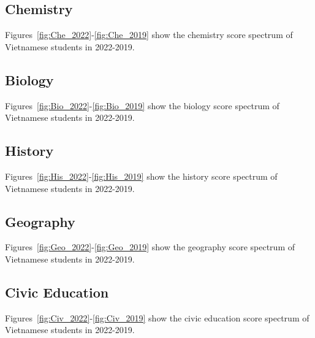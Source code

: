\documentclass{article}
\begin{document}
{	\subsection{Chemistry}
	\label{sec:Score Spectrum_Che}
	
	Figures~\ref{fig:Che_2022}-\ref{fig:Che_2019} show the chemistry score spectrum of Vietnamese students in 2022-2019.
	
	\subsection{Biology}
	\label{sec:Score Spectrum_Bio}
	
	Figures~\ref{fig:Bio_2022}-\ref{fig:Bio_2019} show the biology score spectrum of Vietnamese students in 2022-2019.
	
	\subsection{History}
	\label{sec:Score Spectrum_His}
	
	Figures~\ref{fig:His_2022}-\ref{fig:His_2019} show the history score spectrum of Vietnamese students in 2022-2019.
	
	\subsection{Geography}
	\label{sec:Score Spectrum_Geo}
	
	Figures~\ref{fig:Geo_2022}-\ref{fig:Geo_2019} show the geography score spectrum of Vietnamese students in 2022-2019.
	
	\subsection{Civic Education}
	\label{sec:Score Spectrum_Civ}
	
	Figures~\ref{fig:Civ_2022}-\ref{fig:Civ_2019} show the civic education score spectrum of Vietnamese students in 2022-2019.
	
}
\end{document}

